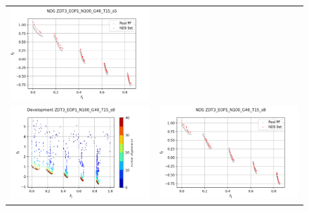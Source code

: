 \begin{figure}[H]
\begin{tabular}{c c}
    \includegraphics[scale=0.5]{figures/ZDT3_EOP1_N100_G40_T15/s5_nds.png}\\
    \includegraphics[scale=0.5]{figures/ZDT3_EOP1_N100_G40_T15/s8_dev.png} &
    \includegraphics[scale=0.5]{figures/ZDT3_EOP1_N100_G40_T15/s8_nds.png}\\

\end{tabular}
\end{figure}

